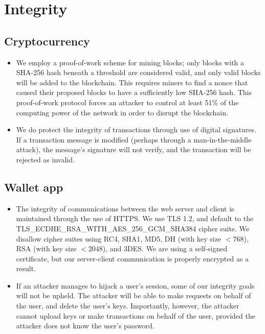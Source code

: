 \documentclass[a4paper,12pt]{article}
\begin{document}
\section{Integrity}

\subsection{Cryptocurrency}

\begin{itemize}
\item We employ a proof-of-work scheme for mining blocks; only blocks with a SHA-256 hash beneath a threshold are considered valid, and only valid blocks will be added to the blockchain.
This requires miners to find a nonce that caused their proposed blocks to have a sufficiently low SHA-256 hash.
This proof-of-work protocol forces an attacker to control at least 51\% of the computing power of the network in order to disrupt the blockchain\cite{bitcoin}. 
\item We do protect the integrity of transactions through use of digital signatures. If a transaction message is modified (perhaps through a man-in-the-middle attack), the message's signature will not verify, and the transaction will be rejected as invalid.
\end{itemize}

\subsection{Wallet app}

\begin{itemize}
\item The integrity of communications between the web server and client is maintained through the use of HTTPS. We use TLS 1.2, and default to the TLS\_ECDHE\_RSA\_WITH\_AES\_256\_GCM\_SHA384 cipher suite. We disallow cipher suites using RC4, SHA1, MD5, DH (with key size $< 768$), RSA (with key size $< 2048$), and 3DES. We are using a self-signed certificate, but our server-client communication is properly encrypted as a result. 
\item If an attacker manages to hijack a user's session, some of our integrity goals will not be upheld. The attacker will be able to make requests on behalf of the  user, and delete the user's keys. Importantly, however, the attacker cannot upload keys or make transactions on behalf of the user, provided the attacker does not know the user's password.
\end{itemize}
\end{document}
